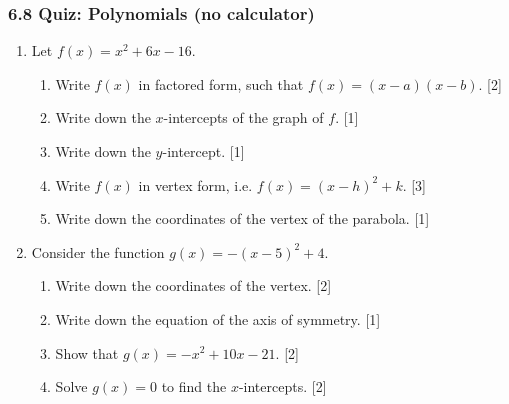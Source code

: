 \documentclass[12pt, twoside]{article}
\begin{document}
\subsubsection*{6.8 Quiz: Polynomials (no calculator)}

\begin{enumerate}[itemsep=0.15cm]

\item[1.] [Maximum mark: 8]

Let $f(x) = x^2 + 6x - 16$.

\begin{enumerate}[itemsep=0.15cm]
  \item Write $f(x)$ in factored form, such that $f(x) = (x - a)(x - b)$. \hfill [2]
  \item Write down the $x$-intercepts of the graph of $f$. \hfill [1]
  \item Write down the $y$-intercept. \hfill [1]
  \item Write $f(x)$ in vertex form, i.e. $f(x) = (x - h)^2 + k$. \hfill [3]
  \item Write down the coordinates of the vertex of the parabola. \hfill [1]
\end{enumerate}


\newpage

\item[2.] [Maximum mark: 7]

Consider the function $g(x) = -(x - 5)^2 + 4$.

\begin{enumerate}[itemsep=0.15cm]
  \item Write down the coordinates of the vertex. \hfill [2]
  \item Write down the equation of the axis of symmetry. \hfill [1]
  \item Show that $g(x) = -x^2 + 10x - 21$. \hfill [2]
  \item Solve $g(x) = 0$ to find the $x$-intercepts. \hfill [2]
\end{enumerate}



\end{enumerate}
\end{document}

